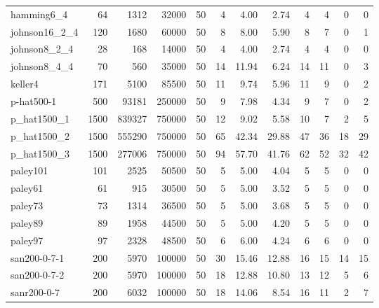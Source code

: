 \begin{tabular}{lrrrrrrrrrrr}
hamming6\_4 & 64 & 1312 & 32000 & 50 & 4 & 4.00 & 2.74 & 4 & 4 & 0 & 0 \\
johnson16\_2\_4 & 120 & 1680 & 60000 & 50 & 8 & 8.00 & 5.90 & 8 & 7 & 0 & 1 \\
johnson8\_2\_4 & 28 & 168 & 14000 & 50 & 4 & 4.00 & 2.74 & 4 & 4 & 0 & 0 \\
johnson8\_4\_4 & 70 & 560 & 35000 & 50 & 14 & 11.94 & 6.24 & 14 & 11 & 0 & 3 \\
keller4 & 171 & 5100 & 85500 & 50 & 11 & 9.74 & 5.96 & 11 & 9 & 0 & 2 \\
p-hat500-1 & 500 & 93181 & 250000 & 50 & 9 & 7.98 & 4.34 & 9 & 7 & 0 & 2 \\
p\_hat1500\_1 & 1500 & 839327 & 750000 & 50 & 12 & 9.02 & 5.58 & 10 & 7 & 2 & 5 \\
p\_hat1500\_2 & 1500 & 555290 & 750000 & 50 & 65 & 42.34 & 29.88 & 47 & 36 & 18 & 29 \\
p\_hat1500\_3 & 1500 & 277006 & 750000 & 50 & 94 & 57.70 & 41.76 & 62 & 52 & 32 & 42 \\
paley101 & 101 & 2525 & 50500 & 50 & 5 & 5.00 & 4.04 & 5 & 5 & 0 & 0 \\
paley61 & 61 & 915 & 30500 & 50 & 5 & 5.00 & 3.52 & 5 & 5 & 0 & 0 \\
paley73 & 73 & 1314 & 36500 & 50 & 5 & 5.00 & 3.68 & 5 & 5 & 0 & 0 \\
paley89 & 89 & 1958 & 44500 & 50 & 5 & 5.00 & 4.20 & 5 & 5 & 0 & 0 \\
paley97 & 97 & 2328 & 48500 & 50 & 6 & 6.00 & 4.24 & 6 & 6 & 0 & 0 \\
san200-0-7-1 & 200 & 5970 & 100000 & 50 & 30 & 15.46 & 12.88 & 16 & 15 & 14 & 15 \\
san200-0-7-2 & 200 & 5970 & 100000 & 50 & 18 & 12.88 & 10.80 & 13 & 12 & 5 & 6 \\
sanr200-0-7 & 200 & 6032 & 100000 & 50 & 18 & 14.06 & 8.54 & 16 & 11 & 2 & 7 \\
\bottomrule
\end{tabular}
